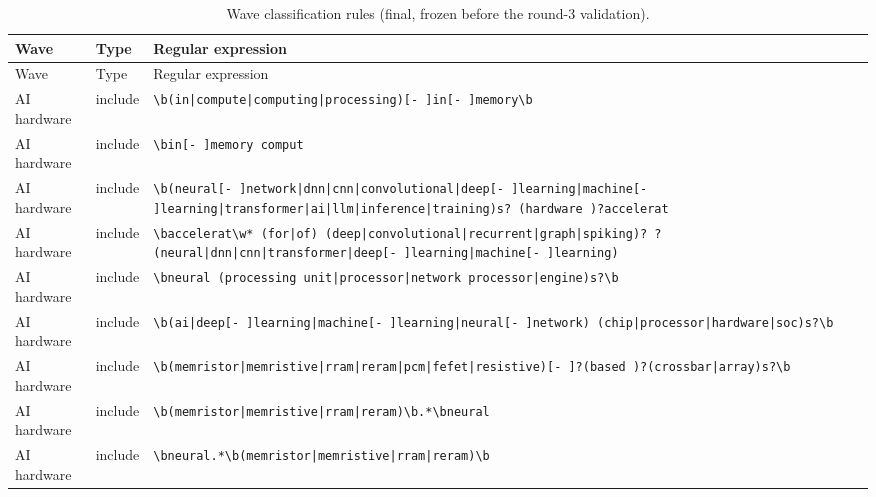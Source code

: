 \documentclass[10pt]{article}
\begin{document}
\begin{longtable}{@{}lL{1.6cm}L{11.5cm}@{}}
\caption{Wave classification rules (final, frozen before the round-3 validation).}\label{tab:S2}\\
\toprule
Wave & Type & Regular expression \\
\midrule
\endfirsthead
\toprule
Wave & Type & Regular expression \\
\midrule
\endhead
\bottomrule
\endlastfoot
AI hardware & include & \texttt{\textbackslash{}b\allowbreak(in\allowbreak|compute\allowbreak|computing\allowbreak|processing)[- ]in[- ]memory\textbackslash{}b} \\
AI hardware & include & \texttt{\textbackslash{}bin[- ]memory comput} \\
AI hardware & include & \texttt{\textbackslash{}b\allowbreak(neural[- ]network\allowbreak|dnn\allowbreak|cnn\allowbreak|convolutional\allowbreak|deep[- ]learning\allowbreak|machine[- ]learning\allowbreak|transformer\allowbreak|ai\allowbreak|llm\allowbreak|inference\allowbreak|training)s? \allowbreak(hardware )?accelerat} \\
AI hardware & include & \texttt{\textbackslash{}baccelerat\textbackslash{}w* \allowbreak(for\allowbreak|of) \allowbreak(deep\allowbreak|convolutional\allowbreak|recurrent\allowbreak|graph\allowbreak|spiking)? ?\allowbreak(neural\allowbreak|dnn\allowbreak|cnn\allowbreak|transformer\allowbreak|deep[- ]learning\allowbreak|machine[- ]learning)} \\
AI hardware & include & \texttt{\textbackslash{}bneural \allowbreak(processing unit\allowbreak|processor\allowbreak|network processor\allowbreak|engine)s?\textbackslash{}b} \\
AI hardware & include & \texttt{\textbackslash{}b\allowbreak(ai\allowbreak|deep[- ]learning\allowbreak|machine[- ]learning\allowbreak|neural[- ]network) \allowbreak(chip\allowbreak|processor\allowbreak|hardware\allowbreak|soc)s?\textbackslash{}b} \\
AI hardware & include & \texttt{\textbackslash{}b\allowbreak(memristor\allowbreak|memristive\allowbreak|rram\allowbreak|reram\allowbreak|pcm\allowbreak|fefet\allowbreak|resistive)[- ]?\allowbreak(based )?\allowbreak(crossbar\allowbreak|array)s?\textbackslash{}b} \\
AI hardware & include & \texttt{\textbackslash{}b\allowbreak(memristor\allowbreak|memristive\allowbreak|rram\allowbreak|reram)\textbackslash{}b.*\textbackslash{}bneural} \\
AI hardware & include & \texttt{\textbackslash{}bneural.*\textbackslash{}b\allowbreak(memristor\allowbreak|memristive\allowbreak|rram\allowbreak|reram)\textbackslash{}b} \\

\end{longtable}
\end{document}
